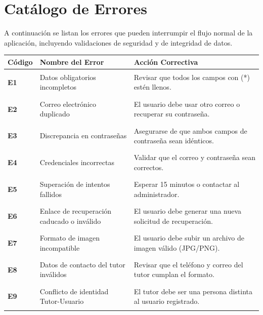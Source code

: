 
\chapter{Catálogo de Errores}
\label{anexo:errores}

A continuación se listan los errores que pueden interrumpir el flujo normal de la aplicación, incluyendo validaciones de seguridad y de integridad de datos.

\begin{table}[htbp]
\centering
\small
\begin{tabular}{|p{2cm}|p{6cm}|p{6cm}|}
\hline
\rowcolor[HTML]{EFEFEF} 
\textbf{Código} & \textbf{Nombre del Error} & \textbf{Acción Correctiva} \\ \hline
\hypertarget{err:E1}{\textbf{E1}} & Datos obligatorios incompletos & Revisar que todos los campos con (*) estén llenos. \\ \hline
\hypertarget{err:E2}{\textbf{E2}} & Correo electrónico duplicado & El usuario debe usar otro correo o recuperar su contraseña. \\ \hline
\hypertarget{err:E3}{\textbf{E3}} & Discrepancia en contraseñas & Asegurarse de que ambos campos de contraseña sean idénticos. \\ \hline
\hypertarget{err:E4}{\textbf{E4}} & Credenciales incorrectas & Validar que el correo y contraseña sean correctos. \\ \hline
\hypertarget{err:E5}{\textbf{E5}} & Superación de intentos fallidos & Esperar 15 minutos o contactar al administrador. \\ \hline
\hypertarget{err:E6}{\textbf{E6}} & Enlace de recuperación caducado o inválido & El usuario debe generar una nueva solicitud de recuperación. \\ \hline
\hypertarget{err:E7}{\textbf{E7}} & Formato de imagen incompatible & El usuario debe subir un archivo de imagen válido (JPG/PNG). \\ \hline
\hypertarget{err:E8}{\textbf{E8}} & Datos de contacto del tutor inválidos & Revisar que el teléfono y correo del tutor cumplan el formato. \\ \hline
\hypertarget{err:E9}{\textbf{E9}} & Conflicto de identidad Tutor-Usuario & El tutor debe ser una persona distinta al usuario registrado. \\ \hline

\end{tabular}
\end{table}
